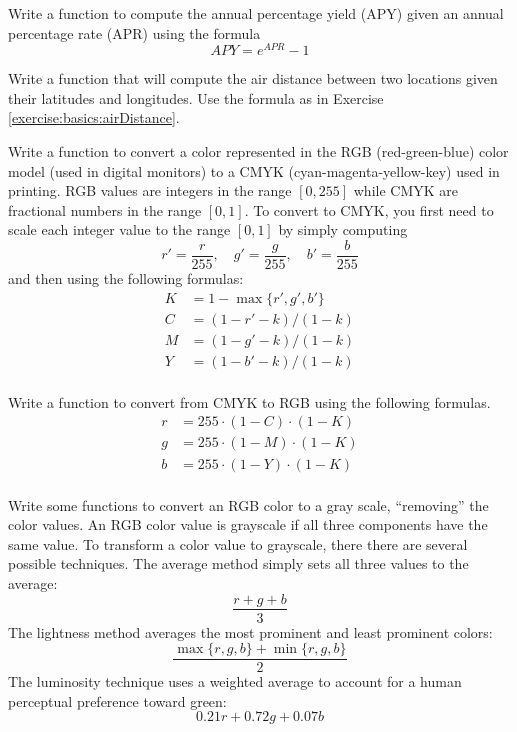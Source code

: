 \begin{exer}
Write a function to compute the annual percentage yield (APY) given
an annual percentage rate (APR) using the formula 
  $$APY = e^{APR} - 1$$
\end{exer}

\begin{exer}
Write a function that will compute the air distance between two locations given their
latitudes and longitudes.  Use the formula as in Exercise \ref{exercise:basics:airDistance}.
\end{exer}

\begin{exer}
Write a function to convert a color represented in the RGB (red-green-blue) 
color model (used in digital monitors) to a CMYK (cyan-magenta-yellow-key) 
used in printing.  RGB values are integers in the range $[0, 255]$ while CMYK 
are fractional numbers in the range $[0, 1]$.  To convert to CMYK, you first need 
to scale each integer value to the range $[0, 1]$ by simply computing
  $$r' = \frac{r}{255}, \quad g' = \frac{g}{255}, \quad b' = \frac{b}{255}$$
and then using the following formulas:
\begin{align*}
K & = 1-\max\{r', g', b'\} \\
C & = (1-r'-k) / (1-k) \\
M & = (1-g'-k) / (1-k) \\
Y & = (1-b'-k) / (1-k) \\
\end{align*}
\end{exer}

\begin{exer}
Write a function to convert from CMYK to RGB using the following formulas.
\begin{align*}
r & = 255 \cdot (1 - C) \cdot (1-K) \\
g & = 255 \cdot (1 - M) \cdot (1-K) \\
b & = 255 \cdot (1 - Y) \cdot (1-K) \\
\end{align*}
\end{exer}

\begin{exer}
Write some functions to convert an RGB color to a gray scale, ``removing'' the color 
values.  An RGB color value is grayscale if all three components have the same 
value.  To transform a color value to grayscale, there there are several possible 
techniques.  The average method simply sets all three values to the average:
  $$\frac{r + g + b}{3}$$
The lightness method averages the most prominent and least prominent colors:
  $$\frac{\max\{r, g, b\} + \min\{r, g, b\}}{2}$$
The luminosity technique uses a weighted average to account for a human perceptual
preference toward green:
  $$0.21 r + 0.72 g + 0.07 b$$
\end{exer}

